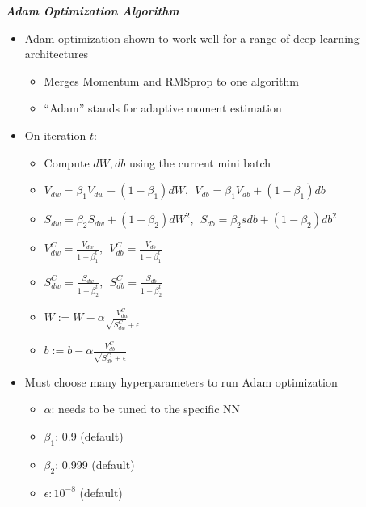 \documentclass[12pt, letterpaper]{article}
\begin{document}
    \vspace{5mm}
    \textbf{\textit{Adam Optimization Algorithm}}
    \begin{itemize}
        \item Adam optimization shown to work well for a range of deep learning architectures
        \begin{itemize}
            \item Merges Momentum and RMSprop to one algorithm 
            \item ``Adam'' stands for adaptive moment estimation
        \end{itemize}
        \item On iteration $t$:
        \begin{itemize}
            \item[] Compute $dW,db$ using the current mini batch
            \item[] $V_{dw}=\beta_1V_{dw}+(1-\beta_1)dW,~~V_{db}=\beta_1V_{db}+(1-\beta_1)db$
            \item[] $S_{dw}=\beta_2S_{dw}+(1-\beta_2)dW^2,~~S_{db}=\beta_2s{db}+(1-\beta_2)db^2$
            \item[] $V_{dw}^{C}=\frac{V_{dw}}{1-\beta_1^t},~~V_{db}^{C}=\frac{V_{db}}{1-\beta_1^t}$
            \item[] $S_{dw}^{C}=\frac{S_{dw}}{1-\beta_2 ^t},~~S_{db}^{C}=\frac{S_{db}}{1-\beta_2 ^t}$
            \item[] $W:=W-\alpha\frac{V_{dw}^{C}}{\sqrt{S_{dw}^{C}}+\epsilon}$
            \item[] $b:=b-\alpha\frac{V_{db}^C}{\sqrt{S_{db}^C}+\epsilon}$
        \end{itemize}
        \item Must choose many hyperparameters to run Adam optimization
        \begin{itemize}
            \item $\alpha$: needs to be tuned to the specific NN
            \item $\beta_1$: 0.9 (default)
            \item $\beta_2$: 0.999 (default)
            \item $\epsilon: 10^{-8}$ (default) 
        \end{itemize}
    \end{itemize}
\end{document}
